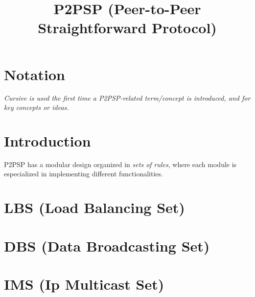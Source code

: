 
\newcommand{\note}[1]{#1}


\newenvironment{notex}
               {\textbf{Note:}
               }
               {
               }

\title{P2PSP (Peer-to-Peer Straightforward Protocol)}
\maketitle

\begin{abstract}

\end{abstract}

\section*{Notation}
\emph{Cursive is used the first time a P2PSP-related term/concept is introduced, and for key concepts or ideas.}

\section*{Introduction}
P2PSP has a modular design organized in \emph{sets of rules}, where
each module is especialized in implementing different functionalities.

\tableofcontents

\section{LBS (Load Balancing Set)}


\section{DBS (Data Broadcasting Set)}


\section{IMS (Ip Multicast Set)}


